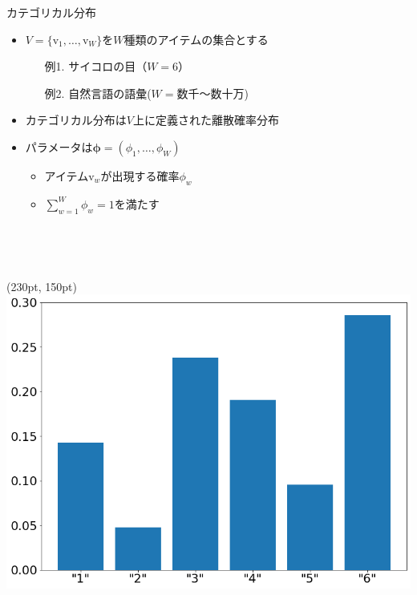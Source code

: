\documentclass[aspectratio=169,unicode,dvipdfmx,14pt]{beamer}
\begin{document}
\begin{frame}{カテゴリカル分布}
\begin{itemize}
\item $V=\{\mbox{v}_1,\ldots,\mbox{v}_W\}$を$W$種類のアイテムの集合とする
\begin{itemize}
\item[例1.] サイコロの目（$W=6$）
\item[例2.] 自然言語の語彙($W=\mbox{数千〜数十万}$)
\end{itemize}
\item カテゴリカル分布は$V$上に定義された離散確率分布
\item パラメータは$\bm{\phi}=(\phi_1,\ldots,\phi_W)$
\begin{itemize}
\item アイテム$\mbox{v}_w$が出現する確率$\phi_w$
\item $\sum_{w=1}^W \phi_w = 1$を満たす
\item[] \ 
\item[] \ 
\end{itemize}
\end{itemize}
\begin{textblock*}{0.5\linewidth}(230pt, 150pt)
    \centering
    \includegraphics[width=0.7\linewidth]{dice_bar_chart.png}
\end{textblock*}
\end{frame}
\end{document}

